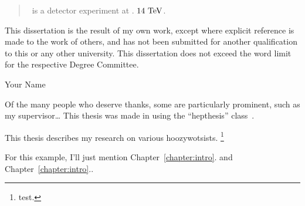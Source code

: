

\begin{abstract}
\atlas\ is a detector experiment at \cern. $14~\eV[T]$.
\end{abstract}


\begin{declaration}
This dissertation is the result of my own work, except where explicit
reference is made to the work of others, and has not been submitted
for another qualification to this or any other university. This
dissertation does not exceed the word limit for the respective Degree
Committee.
\vspace*{1cm}
\begin{flushright}
Your Name
\end{flushright}
\end{declaration}


\begin{acknowledgements}
Of the many people who deserve thanks, some are particularly prominent,
such as my supervisor\dots
This thesis was made in \LaTeXe{} using the ``hepthesis'' class~\cite{hepthesis}.
\end{acknowledgements}


\begin{preface}
This thesis describes my research on various hoozywotsists.%
\footnote{test.}

\noindent
For this example, I'll just mention Chapter~\ref{chapter:intro}.
and Chapter~\ref{chapter:intro}..
\end{preface}


\tableofcontents

\thispagestyle{empty}
